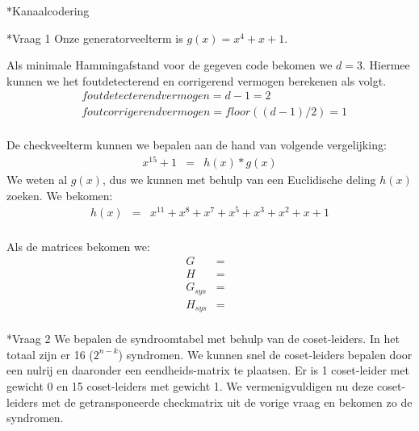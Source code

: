 \documentclass[]{article}
\begin{document}
\begin{section}*{Kanaalcodering}
	\begin{subsection}*{Vraag 1}
		Onze generatorveelterm is $g(x) = x^4 + x + 1$.
		
        Als minimale Hammingafstand voor de gegeven code bekomen we $d=3$. 
        Hiermee kunnen we het foutdetecterend en corrigerend vermogen berekenen als volgt.
        \begin{eqnarray*}
        	& foutdetecterend vermogen = d-1 = 2 \\
        	& foutcorrigerend vermogen = floor((d-1)/2) = 1 \\
        \end{eqnarray*}        
        
        De checkveelterm kunnen we bepalen aan de hand van volgende vergelijking:
        \begin{eqnarray*}
        	x^{15} + 1 &=& h(x) * g(x)
        \end{eqnarray*}
        We weten al $g(x)$, dus we kunnen met behulp van een Euclidische deling $h(x)$ 
        zoeken. We bekomen:
        \begin{eqnarray*}
        	h(x) &=& x^{11} + x^8 + x^7 + x^5 + x^3 + x^2 + x + 1 \\
        \end{eqnarray*}
        
        Als de matrices bekomen we:
        \begin{eqnarray*}
        G &=&\\
        H &=&\\
        G_{sys} &=&\\
        H_{sys} &=&\\
        \end{eqnarray*}

   	\end{subsection}

    \begin{subsection}*{Vraag 2} %
    	We bepalen de syndroomtabel met behulp van de coset-leiders. In het totaal zijn er 16 ($2^{n-k}$) syndromen. We kunnen 	
    	snel de coset-leiders bepalen door een nulrij en daaronder een eendheids-matrix te plaatsen. Er is 1 coset-leider met 
    	gewicht 0 en 15 coset-leiders  met gewicht 1. We vermenigvuldigen nu deze coset-leiders met de getransponeerde checkmatrix uit de vorige vraag en bekomen zo de syndromen.\\
    

\end{subsection}
\end{section}
\end{document}
